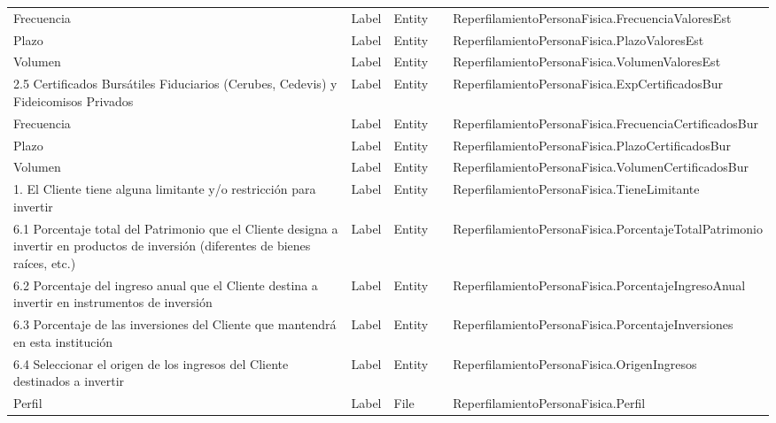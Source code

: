 \begin{table}[H]
{\begin{tabular}{ p{4cm} p{2cm} p{2cm} p{3cm} p{8cm} }
		Frecuencia &
		Label &
		Entity &
		&
		ReperfilamientoPersonaFisica.FrecuenciaValoresEst \\
		Plazo &
		Label &
		Entity &
		&
		ReperfilamientoPersonaFisica.PlazoValoresEst \\
		Volumen &
		Label &
		Entity &
		&
		ReperfilamientoPersonaFisica.VolumenValoresEst \\
		2.5 Certificados Burs\'atiles Fiduciarios (Cerubes, Cedevis) y Fideicomisos Privados &
		Label &
		Entity &
		&
		ReperfilamientoPersonaFisica.ExpCertificadosBur \\
		Frecuencia &
		Label &
		Entity &
		&
		ReperfilamientoPersonaFisica.FrecuenciaCertificadosBur \\
		Plazo &
		Label &
		Entity &
		&
		ReperfilamientoPersonaFisica.PlazoCertificadosBur \\
		Volumen &
		Label &
		Entity &
		&
		ReperfilamientoPersonaFisica.VolumenCertificadosBur \\
		1. El Cliente tiene alguna limitante y/o restricci\'on para invertir &
		Label &
		Entity &
		&
		ReperfilamientoPersonaFisica.TieneLimitante \\
		6.1 Porcentaje total del Patrimonio que el Cliente designa a invertir en productos de inversi\'on (diferentes de bienes ra\'ices, etc.) &
		Label &
		Entity &
		&
		ReperfilamientoPersonaFisica.PorcentajeTotalPatrimonio \\
		6.2 Porcentaje del ingreso anual que el Cliente destina a invertir en instrumentos de inversi\'on &
		Label &
		Entity &
		&
		ReperfilamientoPersonaFisica.PorcentajeIngresoAnual \\
		6.3 Porcentaje de las inversiones del Cliente que mantendr\'a en esta instituci\'on &
		Label &
		Entity &
		&
		ReperfilamientoPersonaFisica.PorcentajeInversiones \\
		6.4 Seleccionar el origen de los ingresos del Cliente destinados a invertir &
		Label &
		Entity &
		&
		ReperfilamientoPersonaFisica.OrigenIngresos \\
		Perfil &
		Label &
		File &
		&
		ReperfilamientoPersonaFisica.Perfil \\
		\hline
	\end{tabular}
	}
\end{table}



